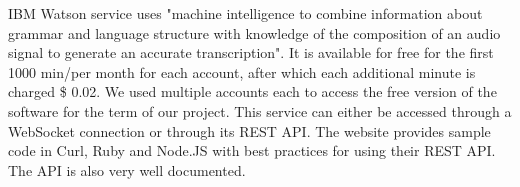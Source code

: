 IBM Watson service uses "machine intelligence to combine information about grammar and language structure with knowledge of the composition of an audio signal to generate an accurate transcription". It is available for free for the first 1000 min/per month for each account, after which each additional minute is charged \$ 0.02. We used multiple accounts each to access the free version of the software for the term of our project. This service can either be accessed through a WebSocket connection or through its REST API. The website provides sample code in Curl, Ruby and Node.JS with best practices for using their REST API. The API is also very well documented.\newline

